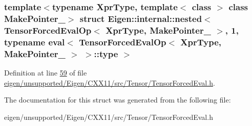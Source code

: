 \subsubsection*{template$<$typename Xpr\+Type, template$<$ class $>$ class Make\+Pointer\+\_\+$>$\newline
struct Eigen\+::internal\+::nested$<$ Tensor\+Forced\+Eval\+Op$<$ Xpr\+Type, Make\+Pointer\+\_\+ $>$, 1, typename eval$<$ Tensor\+Forced\+Eval\+Op$<$ Xpr\+Type, Make\+Pointer\+\_\+ $>$ $>$\+::type $>$}



Definition at line \hyperlink{eigen_2unsupported_2_eigen_2_c_x_x11_2src_2_tensor_2_tensor_forced_eval_8h_source_l00059}{59} of file \hyperlink{eigen_2unsupported_2_eigen_2_c_x_x11_2src_2_tensor_2_tensor_forced_eval_8h_source}{eigen/unsupported/\+Eigen/\+C\+X\+X11/src/\+Tensor/\+Tensor\+Forced\+Eval.\+h}.



The documentation for this struct was generated from the following file\+:\begin{DoxyCompactItemize}
\item 
eigen/unsupported/\+Eigen/\+C\+X\+X11/src/\+Tensor/\+Tensor\+Forced\+Eval.\+h\end{DoxyCompactItemize}
